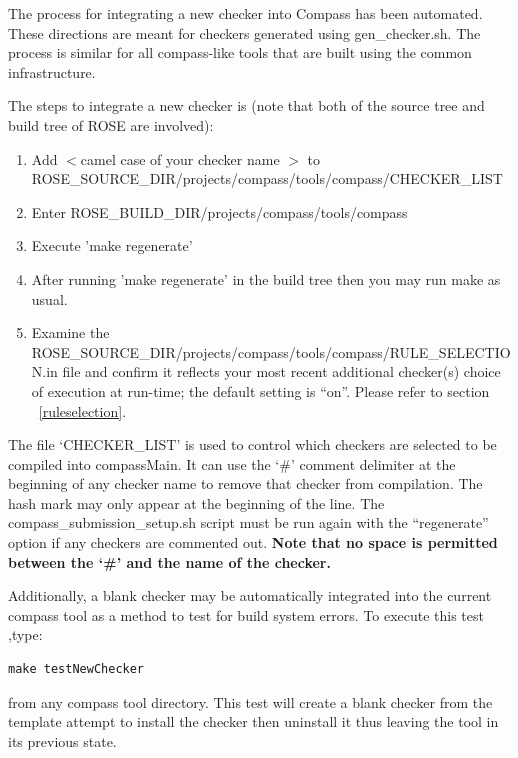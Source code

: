 The process for integrating a new checker into Compass has been automated. 
These directions are meant for checkers generated using gen\_checker.sh. 
The process is similar for all compass-like tools that are built using the 
common infrastructure.

The steps to integrate a new checker is (note that both of the source tree and
build tree of ROSE are involved):
\begin{enumerate}
   \item Add $<$camel case of your checker name $>$ to
   ROSE\_SOURCE\_DIR/projects/compass/tools/compass/CHECKER\_LIST
   \item Enter ROSE\_BUILD\_DIR/projects/compass/tools/compass
   \item Execute 'make regenerate'
   \item After running 'make regenerate' in the build tree then you may run make as usual.
   \item Examine the ROSE\_SOURCE\_DIR/projects/compass/tools/compass/RULE\_SELECTION.in file and confirm it
	reflects your most recent additional checker(s) choice of execution at
	run-time; the default setting is ``on''. Please refer to section 
	~\ref{ruleselection}.
\end{enumerate}

The file `CHECKER\_LIST' is used to control which checkers are selected to
be compiled into compassMain. It can use the `\#' comment delimiter at the beginning of
any checker name to remove that checker from compilation. The hash mark may
only appear at the beginning of the line. The compass\_submission\_setup.sh
script must be run again with the ``regenerate'' option if any checkers are
commented out. 
{\bf Note that no space is permitted between the `\#' and the name
of the checker.}

Additionally, a blank checker may be automatically integrated into the current
compass tool as a method to test for build system errors. To execute this test
,type:
%
\begin{verbatim}
make testNewChecker
\end{verbatim}
%
from any compass tool directory. This test will create a blank checker from
the template attempt to install the checker then uninstall it thus leaving the
tool in its previous state.

